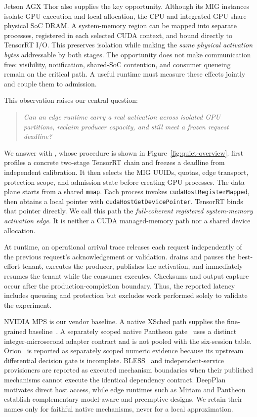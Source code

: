 Jetson AGX Thor also supplies the key opportunity.  Although its MIG instances
isolate GPU execution and local allocation, the CPU and integrated GPU share
physical SoC DRAM.  A system-memory region can be mapped into separate
processes, registered in each selected CUDA context, and bound directly to
TensorRT I/O.  This preserves isolation while making the \emph{same physical
activation bytes} addressable by both stages.  The opportunity does not make
communication free: visibility, notification, shared-SoC contention, and
consumer queueing remain on the critical path.  A useful runtime must measure
these effects jointly and couple them to admission.

This observation raises our central question:
\begin{quote}
\emph{Can an edge runtime carry a real activation across isolated GPU
partitions, reclaim producer capacity, and still meet a frozen request
deadline?}
\end{quote}

We answer with \sys, whose procedure is shown in
Figure~\ref{fig:quiet-overview}.  \sys first profiles a concrete two-stage
TensorRT chain and freezes a deadline from independent calibration.  It then
selects the MIG UUIDs, quotas, edge transport, protection scope, and admission
state before creating GPU processes.  The data plane starts from a shared
\texttt{mmap}.  Each process invokes \texttt{cudaHostRegisterMapped}, then
obtains a local pointer with \texttt{cudaHostGetDevicePointer}.  TensorRT
binds that pointer directly.  We call this
path the \emph{full-coherent registered system-memory activation edge}.  It is
neither a CUDA managed-memory path nor a shared device allocation.

At runtime, an operational arrival trace releases each request independently
of the previous request's acknowledgement or validation.  \sys drains and
pauses the best-effort tenant, executes the producer, publishes the activation,
and immediately resumes the tenant while the consumer executes.  Checksums
and output capture occur after the production-completion boundary.  Thus, the
reported latency includes queueing and protection but excludes work performed
solely to validate the experiment.

NVIDIA MPS is our vendor baseline.  A native XSched path supplies the
fine-grained baseline~\cite{xsched2025}.  A separately scoped native Pantheon
gate~\cite{pantheon2024} uses a distinct integer-microsecond adapter contract
and is not pooled with the six-session table.  Orion~\cite{orion2024} is
reported as separately scoped numeric evidence because its upstream
differential decision gate is incomplete.  BLESS~\cite{bless2025} and
independent-service provisioners are reported as executed mechanism
boundaries when their published mechanisms cannot execute the identical
dependency contract.
DeepPlan~\cite{deepplan2023} motivates direct host access, while edge runtimes
such as Miriam and Pantheon~\cite{miriam2023,pantheon2024} establish
complementary model-aware and preemptive designs.  We retain their names only
for faithful native mechanisms, never for a local approximation.

